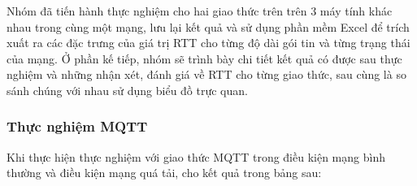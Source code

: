 Nhóm đã tiến hành thực nghiệm cho hai giao thức trên trên 3 máy tính khác nhau trong cùng một mạng, lưu lại kết quả và sử dụng phần mềm Excel để trích xuất ra các đặc trưng của giá trị RTT cho từng độ dài gói tin và từng trạng thái của mạng. Ở phần kế tiếp, nhóm sẽ trình bày chi tiết kết quả có được sau thực nghiệm và những nhận xét, đánh giá về RTT cho từng giao thức, sau cùng là so sánh chúng với nhau sử dụng biểu đồ trực quan.

\subsubsection{Thực nghiệm MQTT}

Khi thực hiện thực nghiệm với giao thức MQTT trong điều kiện mạng bình thường và điều kiện mạng quá tải, cho kết quả trong bảng sau:

